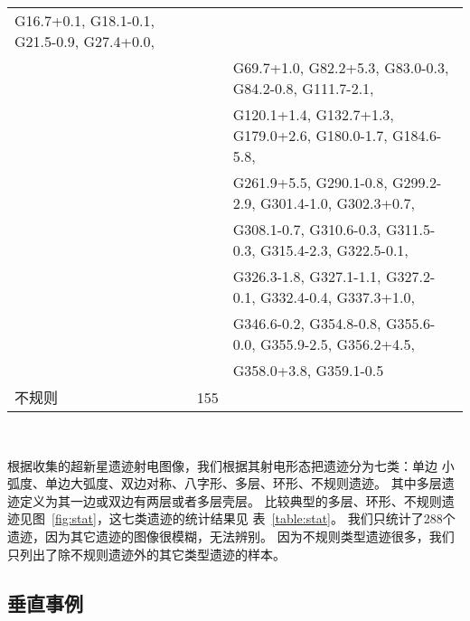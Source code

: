 \begin{table*}
\begin{tabular}{l l l}
      G16.7+0.1, G18.1-0.1,  G21.5-0.9,  G27.4+0.0,\\& & G69.7+1.0, G82.2+5.3, G83.0-0.3, G84.2-0.8, G111.7-2.1,\\& & G120.1+1.4,
      G132.7+1.3,  G179.0+2.6, G180.0-1.7, G184.6-5.8,\\& & G261.9+5.5, G290.1-0.8,  G299.2-2.9, G301.4-1.0, G302.3+0.7,
      \\& & G308.1-0.7, G310.6-0.3, G311.5-0.3, G315.4-2.3,  G322.5-0.1,\\& & G326.3-1.8, G327.1-1.1, G327.2-0.1,  G332.4-0.4,
      G337.3+1.0, \\& & G346.6-0.2,  G354.8-0.8, G355.6-0.0, G355.9-2.5, G356.2+4.5,\\& & G358.0+3.8, G359.1-0.5\\
      \hline
      不规则                       & 155               &\\
      \hline
  \end{tabular}\\
\end{table*}

根据\citet{West2016}收集的超新星遗迹射电图像，我们根据其射电形态把遗迹分为七类：单边
小弧度、单边大弧度、双边对称、八字形、多层、环形、不规则遗迹。
其中多层遗迹定义为其一边或双边有两层或者多层壳层。
比较典型的多层、环形、不规则遗迹见图~\ref{fig:stat}，这七类遗迹的统计结果见
表~\ref{table:stat}。
我们只统计了288个遗迹，因为其它遗迹的图像很模糊，无法辨别。
因为不规则类型遗迹很多，我们只列出了除不规则遗迹外的其它类型遗迹的样本。

\subsection{垂直事例}

